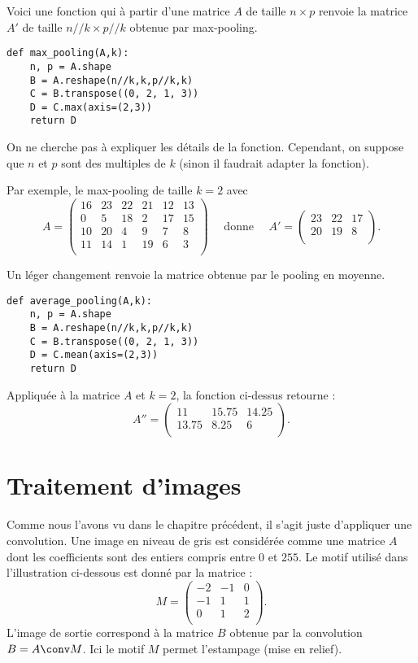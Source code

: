 \documentclass[11pt,class=report,crop=false]{standalone}
\begin{document}

Voici une fonction  qui à partir d'une matrice $A$ de taille $n \times p$ renvoie la matrice $A'$ de taille $n//k \times p //k$ obtenue par max-pooling. 

\begin{lstlisting}
def max_pooling(A,k):
    n, p = A.shape
    B = A.reshape(n//k,k,p//k,k)
    C = B.transpose((0, 2, 1, 3))
    D = C.max(axis=(2,3))
    return D
\end{lstlisting}

On ne cherche pas à expliquer les détails de la fonction. Cependant, on suppose que $n$ et $p$ sont des multiples de $k$ (sinon il faudrait adapter la fonction).


Par exemple, le max-pooling de taille $k=2$ avec
$$A = \begin{pmatrix}
16 & 23 & 22 & 21 & 12 & 13 \\
 0 & 5  & 18 & 2  & 17 & 15 \\
10 & 20 & 4  & 9  & 7  & 8 \\
11 & 14 & 1  & 19 & 6  & 3 \\
\end{pmatrix}
\quad \text{ donne } \quad
A' = \begin{pmatrix}
23 & 22 & 17 \\
20 & 19 & 8 \\
\end{pmatrix}.$$

Un léger changement renvoie la matrice obtenue par le pooling en moyenne.
\begin{lstlisting}
def average_pooling(A,k):
    n, p = A.shape
    B = A.reshape(n//k,k,p//k,k)
    C = B.transpose((0, 2, 1, 3))
    D = C.mean(axis=(2,3))
    return D
\end{lstlisting}
Appliquée à la matrice $A$ et $k=2$, la fonction ci-dessus retourne : 
$$A'' = 
\begin{pmatrix}
11    & 15.75 & 14.25 \\
13.75 & 8.25  & 6 \\
\end{pmatrix}.$$


\section{Traitement d'images}

Comme nous l'avons vu dans le chapitre précédent, il s'agit juste d'appliquer une convolution. Une image en niveau de gris est considérée comme une matrice $A$ dont les coefficients sont des entiers compris entre $0$ et $255$. Le motif utilisé dans l'illustration ci-dessous est donné par la matrice :
$$M = 
\begin{pmatrix}
-2&-1&0\\
-1&1&1\\
0&1&2\\
\end{pmatrix}.$$
L'image de sortie correspond à la matrice $B$ obtenue par la convolution $B = A \conv M$.
Ici le motif $M$ permet l'estampage (mise en relief).
\end{document}
